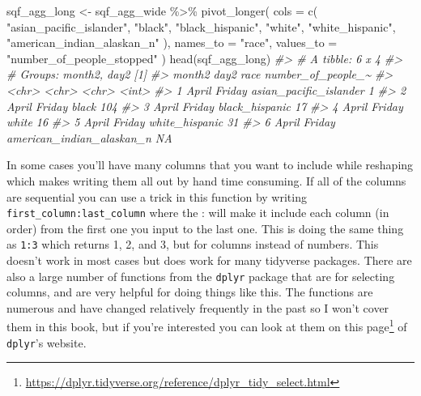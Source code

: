 \documentclass[
]{krantz}
\makeatletter
\newenvironment{Shaded}{\begin{snugshade}}{\end{snugshade}}
\newcommand{\AttributeTok}[1]{\textcolor[rgb]{0.61,0.61,0.61}{#1}}
\newcommand{\CommentTok}[1]{\textcolor[rgb]{0.37,0.37,0.37}{\textit{#1}}}
\newcommand{\FunctionTok}[1]{\textcolor[rgb]{0,0,0}{#1}}
\newcommand{\NormalTok}[1]{#1}
\newcommand{\OtherTok}[1]{\textcolor[rgb]{0.37,0.37,0.37}{#1}}
\newcommand{\SpecialCharTok}[1]{\textcolor[rgb]{0,0,0}{#1}}
\newcommand{\StringTok}[1]{\textcolor[rgb]{0.5,0.5,0.5}{#1}}
\renewcommand{\href}[2]{#2\footnote{\url{#1}}}
\newenvironment{kframe}{%
\medskip{}
\setlength{\fboxsep}{.8em}
 \def\at@end@of@kframe{}%
 \ifinner\ifhmode%
  \def\at@end@of@kframe{\end{minipage}}%
  \begin{minipage}{\columnwidth}%
 \fi\fi%
 \def\FrameCommand##1{\hskip\@totalleftmargin \hskip-\fboxsep
 \colorbox{shadecolor}{##1}\hskip-\fboxsep
     \hskip-\linewidth \hskip-\@totalleftmargin \hskip\columnwidth}%
 \MakeFramed {\advance\hsize-\width
   \@totalleftmargin\z@ \linewidth\hsize
   \@setminipage}}%
 {\par\unskip\endMakeFramed%
 \at@end@of@kframe}
\renewenvironment{Shaded}{\begin{kframe}}{\end{kframe}}
\makeatother
\begin{document}
\begin{Shaded}
\begin{Highlighting}[]
\NormalTok{sqf\_agg\_long }\OtherTok{\textless{}{-}}\NormalTok{ sqf\_agg\_wide }\SpecialCharTok{\%\textgreater{}\%}
  \FunctionTok{pivot\_longer}\NormalTok{(}
    \AttributeTok{cols =} \FunctionTok{c}\NormalTok{(}
      \StringTok{"asian\_pacific\_islander"}\NormalTok{,}
      \StringTok{"black"}\NormalTok{,}
      \StringTok{"black\_hispanic"}\NormalTok{,}
      \StringTok{"white"}\NormalTok{,}
      \StringTok{"white\_hispanic"}\NormalTok{,}
      \StringTok{"american\_indian\_alaskan\_n"}
\NormalTok{    ),}
    \AttributeTok{names\_to =} \StringTok{"race"}\NormalTok{,}
    \AttributeTok{values\_to =} \StringTok{"number\_of\_people\_stopped"}
\NormalTok{  )}
\FunctionTok{head}\NormalTok{(sqf\_agg\_long)}
\CommentTok{\#\textgreater{} \# A tibble: 6 x 4}
\CommentTok{\#\textgreater{} \# Groups:   month2, day2 [1]}
\CommentTok{\#\textgreater{}   month2 day2   race                      number\_of\_people\_\textasciitilde{}}
\CommentTok{\#\textgreater{}   \textless{}chr\textgreater{}  \textless{}chr\textgreater{}  \textless{}chr\textgreater{}                                  \textless{}int\textgreater{}}
\CommentTok{\#\textgreater{} 1 April  Friday asian\_pacific\_islander                     1}
\CommentTok{\#\textgreater{} 2 April  Friday black                                    104}
\CommentTok{\#\textgreater{} 3 April  Friday black\_hispanic                            17}
\CommentTok{\#\textgreater{} 4 April  Friday white                                     16}
\CommentTok{\#\textgreater{} 5 April  Friday white\_hispanic                            31}
\CommentTok{\#\textgreater{} 6 April  Friday american\_indian\_alaskan\_n                 NA}
\end{Highlighting}
\end{Shaded}

In some cases you'll have many columns that you want to
include while reshaping which makes writing them all out by
hand time consuming. If all of the columns are sequential
you can use a trick in this function by writing
\texttt{first\_column:last\_column} where the : will make it
include each column (in order) from the first one you input
to the last one. This is doing the same thing as
\texttt{1:3} which returns 1, 2, and 3, but for columns
instead of numbers. This doesn't work in most cases but does
work for many tidyverse packages. There are also a large
number of functions from the \texttt{dplyr} package that are
for selecting columns, and are very helpful for doing things
like this. The functions are numerous and have changed
relatively frequently in the past so I won't cover them in
this book, but if you're interested you can look at them on
\href{https://dplyr.tidyverse.org/reference/dplyr_tidy_select.html}{this
page} of \texttt{dplyr}'s website.
\end{document}
